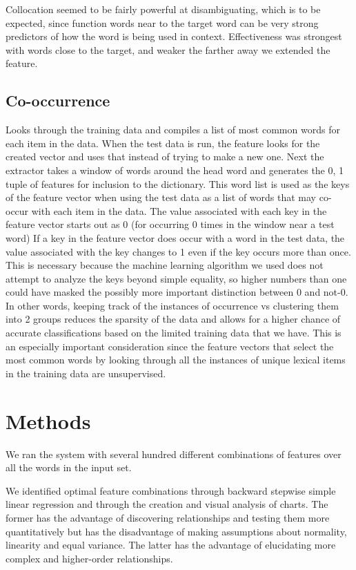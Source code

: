 \documentclass{article}
\begin{document}
Collocation seemed to be fairly powerful at disambiguating, which is to be
expected, since function words near to the target word can be very strong
predictors of how the word is being used in context.  Effectiveness was
strongest with words close to the target, and weaker the farther away we
extended the feature.

\subsection{Co-occurrence}

Looks through the training data and compiles a list of most common words for
each item in the data. When the test data is run, the feature looks for the
created vector and uses that instead of trying to make a new one. Next the
extractor takes a window of words around the head word and generates the 0, 1
tuple of features for inclusion to the dictionary. This word list is used as the
keys of the feature vector when using the test data as a list of words that may
co-occur with each item in the data. The value associated with each key in the
feature vector starts out as 0 (for occurring 0 times in the window near a test
word) If a key in the feature vector does occur with a word in the test data,
the value associated with the key changes to 1 even if the key occurs more than
once.  This is necessary because the machine learning algorithm we used does not
attempt to analyze the keys beyond simple equality, so higher numbers than one
could have masked the possibly more important distinction between 0 and not-0.
In other words, keeping track of the instances of occurrence vs clustering them
into 2 groups reduces the sparsity of the data and allows for a higher chance of
accurate classifications based on the limited training data that we have. This
is an especially important consideration since the feature vectors that select
the most common words by looking through all the instances of unique lexical
items in the training data are unsupervised.

\section{Methods}
We ran the system with several hundred different combinations of features over
all the words in the input set.

We identified optimal feature combinations through backward stepwise simple
linear regression and through the creation and visual analysis of charts. The
former has the advantage of discovering relationships and testing them more
quantitatively but has the disadvantage of making assumptions about normality,
linearity and equal variance.  The latter has the advantage of elucidating more
complex and higher-order relationships.
\end{document}
